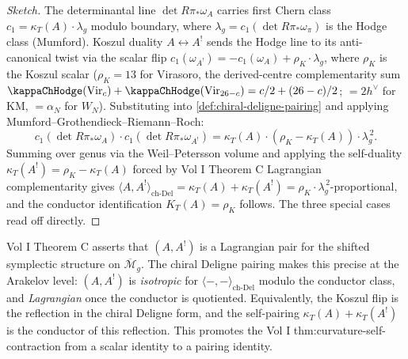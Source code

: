 \begin{proof}[Sketch]
The determinantal line \(\det R\pi_{*}\omega_{A}\) carries first
Chern class \(c_{1} = \kappa_{T}(A) \cdot \lambda_{g}\) modulo
boundary, where \(\lambda_{g} = c_{1}(\det R\pi_{*}\omega_{\pi})\)
is the Hodge class (Mumford). Koszul duality
\(A \leftrightarrow A^{!}\) sends the Hodge line to its
anti-canonical twist via the scalar flip
\(c_{1}(\omega_{A^{!}}) = -c_{1}(\omega_{A}) + \rho_{K}
\cdot \lambda_{g}\), where \(\rho_{K}\) is the Koszul scalar
(\(\rho_{K} = 13\) for Virasoro, the derived-centre complementarity
sum \(\kappaChHodge(\mathrm{Vir}_{c}) + \kappaChHodge(\mathrm{Vir}_{26-c})
= c/2 + (26-c)/2\); \(=2 h^{\vee}\) for KM,
\(= \alpha_{N}\) for \(W_{N}\)). Substituting into
\autoref{def:chiral-deligne-pairing} and applying
Mumford--Grothendieck--Riemann--Roch:
\[
 c_{1}(\det R\pi_{*}\omega_{A}) \cdot
 c_{1}(\det R\pi_{*}\omega_{A^{!}})
 =
 \kappa_{T}(A) \cdot (\rho_{K} - \kappa_{T}(A))
 \cdot \lambda_{g}^{\,2}.
\]
Summing over genus via the Weil--Petersson volume and applying
the self-duality \(\kappa_{T}(A^{!}) = \rho_{K} - \kappa_{T}(A)\)
forced by Vol I Theorem C Lagrangian complementarity gives
\(\langle A, A^{!}\rangle_{\mathrm{ch\text{-}Del}} =
\kappa_{T}(A) + \kappa_{T}(A^{!})
= \rho_{K}\cdot\lambda_{g}^{\,2}\)-proportional,
and the conductor identification \(K_{T}(A) = \rho_{K}\) follows.
The three special cases read off directly.
\end{proof}

\begin{remark}
\label{rem:chiral-deligne-lagrangian}
Vol I Theorem C asserts that \((A, A^{!})\) is a Lagrangian pair
for the shifted symplectic structure on
\(\overline{\mathcal{M}}_{g}\). The chiral Deligne pairing makes
this precise at the Arakelov level:
\((A, A^{!})\) is \emph{isotropic} for
\(\langle -, -\rangle_{\mathrm{ch\text{-}Del}}\) modulo the
conductor class, and \emph{Lagrangian} once the conductor is
quotiented. Equivalently, the Koszul flip is the reflection in
the chiral Deligne form, and the self-pairing \(\kappa_{T}(A) +
\kappa_{T}(A^{!})\) is the conductor of this reflection. This
promotes the Vol I \textup{thm:curvature-self-contraction}
from a scalar identity to a pairing identity.
\end{remark}

